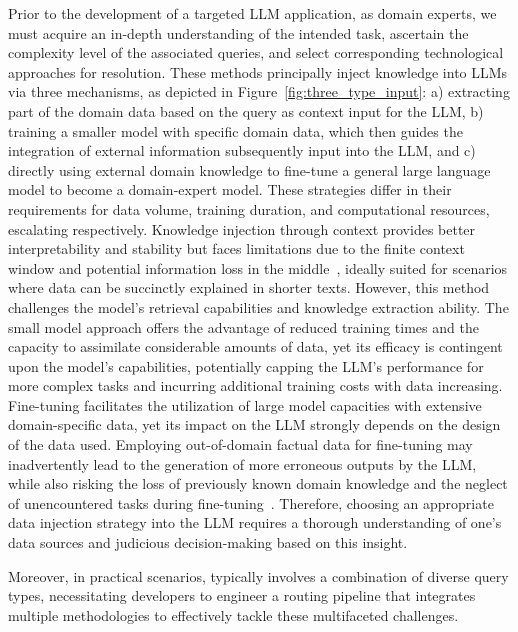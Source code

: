 Prior to the development of a targeted LLM application, as domain experts, we must acquire an in-depth understanding of the intended task, ascertain the complexity level of the associated queries, and select corresponding technological approaches for resolution. These methods principally inject knowledge into LLMs via three mechanisms, as depicted in Figure~\ref{fig:three_type_input}: a) extracting part of the domain data based on the query as context input for the LLM, b) training a smaller model with specific domain data, which then guides the integration of external information subsequently input into the LLM, and c) directly using external domain knowledge to fine-tune a general large language model to become a domain-expert model. These strategies differ in their requirements for data volume, training duration, and computational resources, escalating respectively. Knowledge injection through context provides better interpretability and stability but faces limitations due to the finite context window and potential information loss in the middle~\cite{liu2024lost}, ideally suited for scenarios where data can be succinctly explained in shorter texts. However, this method challenges the model's retrieval capabilities and knowledge extraction ability. The small model approach offers the advantage of reduced training times and the capacity to assimilate considerable amounts of data, yet its efficacy is contingent upon the model's capabilities, potentially capping the LLM’s performance for more complex tasks and incurring additional training costs with data increasing. Fine-tuning facilitates the utilization of large model capacities with extensive domain-specific data, yet its impact on the LLM strongly depends on the design of the data used. Employing out-of-domain factual data for fine-tuning may inadvertently lead to the generation of more erroneous outputs by the LLM, while also risking the loss of previously known domain knowledge and the neglect of unencountered tasks during fine-tuning~\cite{fine_tune_new_24, sun2024amuro}. Therefore, choosing an appropriate data injection strategy into the LLM requires a thorough understanding of one's data sources and judicious decision-making based on this insight.

Moreover, in practical scenarios, \app typically involves a combination of diverse query types, necessitating developers to engineer a routing pipeline that integrates multiple methodologies to effectively tackle these multifaceted challenges.
